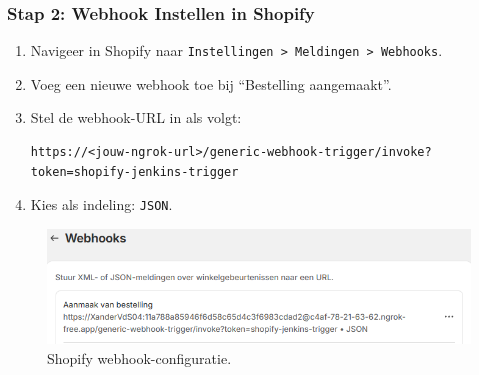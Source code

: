 \subsubsection{Stap 2: Webhook Instellen in Shopify}
\begin{enumerate}
    \item Navigeer in Shopify naar \texttt{Instellingen > Meldingen > Webhooks}.
    \item Voeg een nieuwe webhook toe bij ``Bestelling aangemaakt''.
    \item Stel de webhook-URL in als volgt:
    \begin{lstlisting}[language=text]
        https://<jouw-ngrok-url>/generic-webhook-trigger/invoke?token=shopify-jenkins-trigger
    \end{lstlisting}
    \item Kies als indeling: \texttt{JSON}.
\end{enumerate}

\vspace{0.5em}
\begin{figure}[H]
    \centering
    \includegraphics[width=1\linewidth]{foto's/ShopifyWebhookConfig.png}
    \caption{Shopify webhook-configuratie.}
    \label{fig:Shopify-Webhook-configuratie}
\end{figure}

